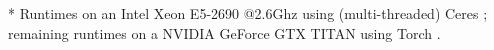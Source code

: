 \begin{table*}
{    %
    * Runtimes on an Intel\textregistered\xspace Xeon\textregistered\xspace E5-2690 @2.6Ghz using (multi-threaded) Ceres \cite{Agarwal2012}; remaining runtimes on a NVIDIA\texttrademark\xspace GeForce\textregistered\xspace GTX TITAN using Torch \cite{Collobert2011}.}
    \label{table:experiments-shapenet-kitti}
    \vspace*{-0.25cm}
\end{table*}
